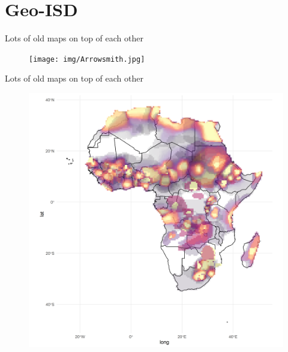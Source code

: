 \documentclass{beamer}
\begin{document}
\section{Geo-ISD}

\begin{frame}{Lots of old maps on top of each other}

	\begin{figure}[htpb]
		\centering
		\texttt{[image: img/Arrowsmith.jpg]}
	\end{figure}

\end{frame}

\begin{frame}{Lots of old maps on top of each other}

	\begin{figure}[htpb]
		\centering
		\includegraphics[width=0.7\linewidth]{img/geo_isd_all.png}
	\end{figure}

\end{frame}
\end{document}
